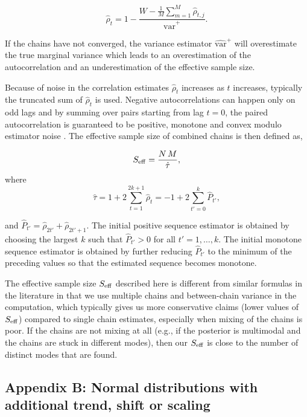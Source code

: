 \documentclass[american,]{article}
\theoremstyle{definition}
\begin{document}
\begin{equation}
\hat{\rho}_t
= 1 - \frac{\displaystyle W - \textstyle \frac{1}{M}\sum_{m=1}^M 
\hat{\rho}_{t,j}}{\widehat{\mbox{var}}^{+}}. \label{rhohat}
\end{equation}

If the chains have not converged, the variance estimator
\(\widehat{\mbox{var}}^{+}\) will overestimate the true marginal
variance which leads to an overestimation of the autocorrelation and an
underestimation of the effective sample size.

Because of noise in the correlation estimates \(\hat{\rho}_t\) increases
as \(t\) increases, typically the truncated sum of \(\hat{\rho}_t\) is
used. Negative autocorrelations can happen only on odd lags and by
summing over pairs starting from lag \(t=0\), the paired autocorrelation
is guaranteed to be positive, monotone and convex modulo estimator noise
\citep{Geyer:1992, Geyer:2011}. The effective sample size of combined
chains is then defined as,

\begin{equation}
S_{\rm eff} = \frac{N \, M}{\hat{\tau}},
\end{equation}
where
\begin{equation}
\hat{\tau} = 1 + 2 \sum_{t=1}^{2k+1} \hat{\rho}_t = 
-1 + 2 \sum_{t'=0}^{k} \hat{P}_{t'},
\end{equation}

and \(\hat{P}_{t'}=\hat{\rho}_{2t'}+\hat{\rho}_{2t'+1}\). The initial
positive sequence estimator is obtained by choosing the largest \(k\)
such that \(\hat{P}_{t'}>0\) for all \(t' = 1,\ldots,k\). The initial
monotone sequence estimator is obtained by further reducing
\(\hat{P}_{t'}\) to the minimum of the preceding values so that the
estimated sequence becomes monotone.

The effective sample size \(S_{\rm eff}\) described here is different
from similar formulas in the literature in that we use multiple chains
and between-chain variance in the computation, which typically gives us
more conservative claims (lower values of \(S_{\rm eff}\)) compared to
single chain estimates, especially when mixing of the chains is poor. If
the chains are not mixing at all (e.g., if the posterior is multimodal and
the chains are stuck in different modes), then our \(S_{\rm eff}\) is
close to the number of distinct modes that are found.



\hypertarget{AppendixD}{%
\subsection*{Appendix B: Normal distributions with additional trend,
shift or scaling}\label{AppendixD}}
\end{document}
